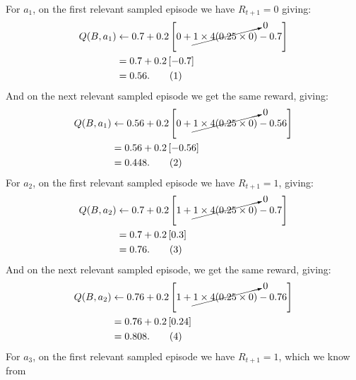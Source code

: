 \documentclass{article}
\newcommand\numberthis{\addtocounter{equation}{1}\tag{\theequation}}
\begin{document}
\begin{enumerate}
	      For $a_1$, on the first relevant sampled episode we have $R_{t+1} = 0$ giving:
	      \begin{align*}
		      Q(B, a_1) & \leftarrow  0.7 + 0.2 \left[ 0 +\cancelto{0}{1 \times 4(0.25 \times 0)}
		      - 0.7 \right]                                                                       \\
		                & = 0.7 + 0.2 \left[- 0.7 \right]                                         \\
		                & = 0.56.\numberthis                                                      \\
	      \end{align*}
	      And on the next relevant sampled episode we get the same reward, giving:
	      \begin{align*}
		      Q(B, a_1) & \leftarrow 0.56 + 0.2 \left[0 + \cancelto{0}{1 \times 4(0.25 \times 0)} - 0.56
		      \right]                                                                                    \\
		                & = 0.56 + 0.2 \left[- 0.56 \right]                                              \\
		                & = 0.448.\numberthis
	      \end{align*}
	      For $a_2$, on the first relevant sampled episode we have $R_{t+1} = 1$, giving:
	      \begin{align*}
		      Q(B, a_2) & \leftarrow 0.7 + 0.2 \left[ 1 + \cancelto{0}{1 \times 4(0.25 \times 0)} - 0.7
		      \right]                                                                                   \\
		                & = 0.7 + 0.2 \left[0.3 \right]                                                 \\
		                & = 0.76. \numberthis
	      \end{align*}
	      And on the next relevant sampled episode, we get the same reward, giving:
	      \begin{align*}
		      Q(B, a_2) & \leftarrow 0.76 + 0.2 \left[ 1 + \cancelto{0}{1 \times 4(0.25 \times 0)}
		      - 0.76 \right]                                                                       \\
		                & = 0.76 + 0.2 \left[0.24 \right]                                          \\
		                & = 0.808. \numberthis
	      \end{align*}
	      For $a_3$, on the first relevant sampled episode we have $R_{t+1} = 1$, which we know from

\end{enumerate}
\end{document}
